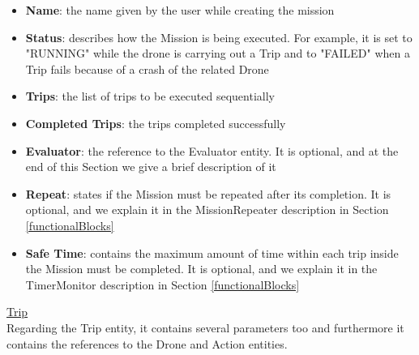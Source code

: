 \begin{itemize}
\item{\textbf{Name}: the name given by the user while creating the mission}
\item{\textbf{Status}: describes how the Mission is being executed. For example, it is set to "RUNNING" while the drone is carrying out a Trip and to "FAILED" when a Trip fails because of a crash of the related Drone}
\item{\textbf{Trips}: the list of trips to be executed sequentially}
\item{\textbf{Completed Trips}: the trips completed successfully}
\item{\textbf{Evaluator}: the reference to the Evaluator entity. It is optional, and at the end of this Section we give a brief description of it}
\item{\textbf{Repeat}: states if the Mission must be repeated after its completion. It is optional, and we explain it in the MissionRepeater description in Section \ref{functionalBlocks}}
\item{\textbf{Safe Time}: contains the maximum amount of time within each trip inside the Mission must be completed. It is optional, and we explain it in the TimerMonitor description in Section \ref{functionalBlocks}}
\end{itemize}

\underline{Trip}
\\

Regarding the Trip entity, it contains several parameters too and furthermore it contains the references to the Drone  and Action entities.

